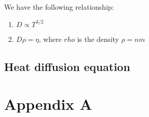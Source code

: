 \documentclass{article}
\begin{document}
We have the following relationship:
\begin{enumerate}
    \item $ D \propto T^{3/2}$
    \item $D \rho = \eta $, where $rho$ is the density $\rho = nm$
\end{enumerate}

\subsection*{Heat diffusion equation}

\pagebreak
\section*{Appendix A}
\end{document}
